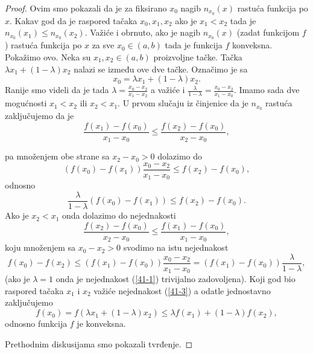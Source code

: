 \documentclass[a4paper,12pt]{article}
\theoremstyle{plain}
\theoremstyle{definition}
\theoremstyle{remark}
\begin{document}
\begin{proof}
Ovim smo pokazali da je za fiksirano $x_0$ nagib $n_{x_0}(x)$ rastuća funkcija po $x$. Kakav god da je raspored tačaka $x_0, x_1, x_2$ ako je $x_1 < x_2$ tada je $n_{x_0}(x_1) \leq n_{x_0}(x_2)$.
Važiće i obrnuto, ako je nagib $n_{x_0}(x)$ (zadat funkcijom $f$) rastuća funkcija po $x$ za sve $x_0 \in (a,b)$ tada je funkcija $f$ konveksna. Pokažimo ovo. Neka su $x_1, x_2 \in (a,b)$ proizvoljne tačke. Tačka $\lambda x_1 + (1 - \lambda)x_2$ nalazi se između ove dve tačke. Označimo je sa
\begin{equation*}
x_0 = \lambda x_1 + (1 - \lambda)x_2.
\end{equation*}
Ranije smo videli da je tada $\lambda = \frac{x_0 - x_2}{x_1 - x_2}$ a važiće i $\frac{\lambda}{1 - \lambda} = \frac{x_0 - x_2}{x_1 - x_0}$. Imamo sada dve mogućnosti $x_1 < x_2$ ili $x_2 < x_1$. U prvom slučaju iz činjenice da je $n_{x_0}$ rastuća zaključujemo da je
\begin{equation*}
\frac{f(x_1) - f(x_0)}{x_1 - x_0} \leq \frac{f(x_2) - f(x_0)}{x_2 - x_0},
\end{equation*}

pa množenjem obe strane sa $x_2 - x_0 > 0$ dolazimo do
\begin{equation*}
(f(x_0) - f(x_1))\frac{x_0 - x_2}{x_1 - x_0} \leq f(x_2) - f(x_0),
\end{equation*}
odnosno
\begin{equation*}
\frac{\lambda}{1 - \lambda}(f(x_0) - f(x_1)) \leq f(x_2) - f(x_0).
\end{equation*}
Ako je $x_2 < x_1$ onda dolazimo do nejednakosti
\begin{equation*}
\frac{f(x_2) - f(x_0)}{x_2 - x_0} \leq \frac{f(x_1) - f(x_0)}{x_1 - x_0},
\end{equation*}
koju množenjem sa $x_0 - x_2 > 0$ svodimo na istu nejednakost
\begin{equation}
f(x_0) - f(x_2) \leq (f(x_1) - f(x_0))\frac{x_0 - x_2}{x_1 - x_0} = (f(x_1) - f(x_0))\frac{\lambda}{1 - \lambda},
\label{41-3}
\end{equation}
(ako je $\lambda = 1$ onda je nejednakost (\ref{41-1}) trivijalno zadovoljena). Koji god bio raspored tačaka $x_1$ i $x_2$ važiće nejednakost (\ref{41-3}) a odatle jednostavno zaključujemo
\begin{equation*}
f(x_0) = f(\lambda x_1 + (1 - \lambda)x_2) \leq \lambda f(x_1) + (1 - \lambda)f(x_2),
\end{equation*}
odnosno funkcija $f$ je konveksna.

Prethodnim diskusijama smo pokazali tvrđenje.
\end{proof}
\end{document}
